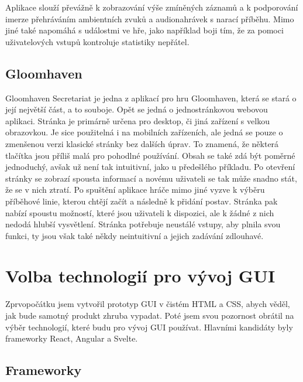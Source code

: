 Aplikace slouží převážně k zobrazování výše zmíněných záznamů a k podporování imerze přehráváním ambientních zvuků a audionahrávek s narací příběhu. Mimo jiné také napomáhá s událostmi ve hře, jako například boji tím, že za pomoci uživatelových vstupů kontroluje statistiky nepřátel.

\subsection{Gloomhaven}
Gloomhaven Secretariat je jedna z aplikací pro hru Gloomhaven, která se stará o její největší část, a to souboje. Opět se jedná o jednostránkovou webovou aplikaci. Stránka je primárně určena pro desktop, či jiná zařízení s velkou obrazovkou. Je sice použitelná i na mobilních zařízeních, ale jedná se pouze o zmenšenou verzi klasické stránky bez dalších úprav. To znamená, že některá tlačítka jsou příliš malá pro pohodlné používání. Obsah se také zdá být poměrné jednoduchý, avšak už není tak intuitivní, jako u předešlého příkladu. Po otevření stránky se zobrazí spousta informací a novému uživateli se tak může snadno stát, že se v nich ztratí. Po spuštění aplikace hráče mimo jiné vyzve k výběru příběhové linie, kterou chtějí začít a následně k přidání postav. Stránka pak nabízí spoustu možností, které jsou uživateli k dispozici, ale k žádné z nich nedodá hlubší vysvětlení. Stránka potřebuje neustálé vstupy, aby plnila svou funkci, ty jsou však také někdy neintuitivní a jejich zadávání zdlouhavé.

\section{Volba technologií pro vývoj GUI}
Zprvopočátku jsem vytvořil prototyp GUI v čistém HTML a CSS, abych věděl, jak bude samotný produkt zhruba vypadat. Poté jsem svou pozornost obrátil na výběr technologií, které budu pro vývoj GUI používat. Hlavními kandidáty byly frameworky React, Angular a Svelte.

\subsection{Frameworky}

